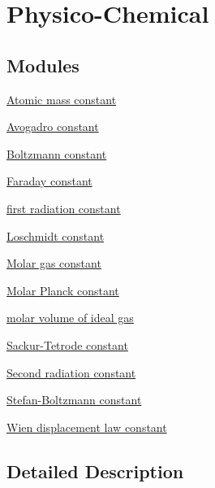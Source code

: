 \hypertarget{group___physico_chemical}{}\section{Physico-\/\+Chemical}
\label{group___physico_chemical}
\subsection*{Modules}
\begin{DoxyCompactItemize}
\item 
\hyperlink{group___atomic_mass_constant}{Atomic mass constant}
\item 
\hyperlink{group___avogadro_constant}{Avogadro constant}
\item 
\hyperlink{group___boltzmann_constant}{Boltzmann constant}
\item 
\hyperlink{group___faraday_constant}{Faraday constant}
\item 
\hyperlink{group___first_radiation_constant}{first radiation constant}
\item 
\hyperlink{group___loschmidt_constant}{Loschmidt constant}
\item 
\hyperlink{group___molar_gas_constant}{Molar gas constant}
\item 
\hyperlink{group___molar_planck_constant}{Molar Planck constant}
\item 
\hyperlink{group___molar_volume}{molar volume of ideal gas}
\item 
\hyperlink{group___sackur_tetrode_constant}{Sackur-\/\+Tetrode constant}
\item 
\hyperlink{group___second_radiation_constant}{Second radiation constant}
\item 
\hyperlink{group___stefan_boltzmann_constant}{Stefan-\/\+Boltzmann constant}
\item 
\hyperlink{group___wien_displacement}{Wien displacement law constant}
\end{DoxyCompactItemize}


\subsection{Detailed Description}
